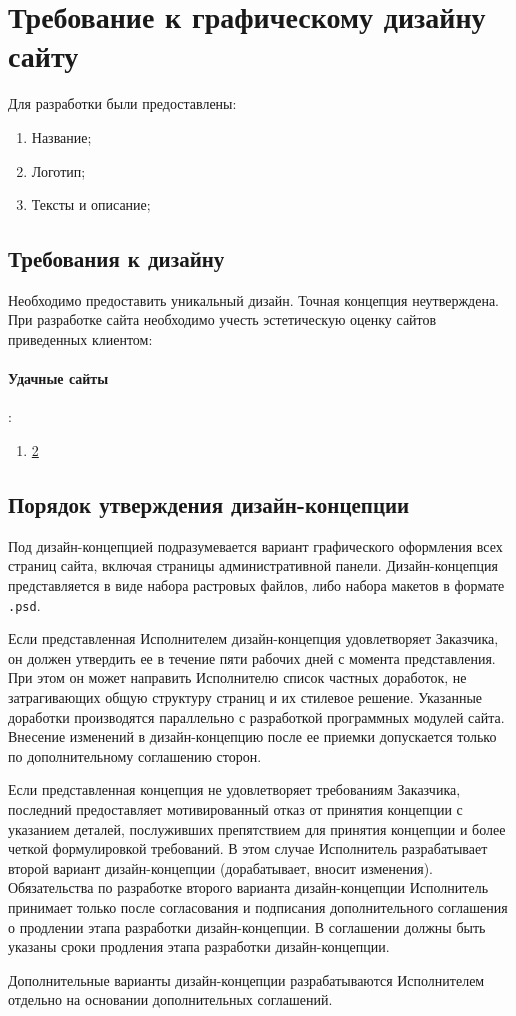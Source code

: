 \section{Требование к графическому дизайну сайту}
Для разработки были предоставлены:
\begin{enumerate}
  \item Название;
  \item Логотип;
  \item Тексты и описание;
\end{enumerate}
\subsection{Требования к дизайну}
Необходимо предоставить уникальный дизайн. Точная концепция неутверждена.
При разработке сайта необходимо учесть эстетическую оценку сайтов приведенных клиентом:
\paragraph{Удачные сайты}:
\begin{enumerate}
  \item \href{1}{2}
\end{enumerate}

\subsection{Порядок утверждения дизайн-концепции}
Под дизайн-концепцией подразумевается вариант графического оформления всех страниц сайта, включая страницы административной панели. Дизайн-концепция представляется в виде набора растровых файлов, либо набора макетов в формате \texttt{.psd}.

Если представленная Исполнителем дизайн-концепция удовлетворяет Заказчика, он должен утвердить ее в течение пяти рабочих дней с момента представления. При этом он может направить Исполнителю список частных доработок, не затрагивающих общую структуру страниц и их стилевое решение. Указанные доработки производятся параллельно с разработкой программных модулей сайта. Внесение изменений в дизайн-концепцию после ее приемки допускается только по дополнительному соглашению сторон.

Если представленная концепция не удовлетворяет требованиям Заказчика, последний предоставляет мотивированный отказ от принятия концепции с указанием деталей, послуживших препятствием для принятия концепции и более четкой формулировкой требований. В этом случае Исполнитель разрабатывает второй вариант дизайн-концепции (дорабатывает, вносит изменения). Обязательства по разработке второго варианта дизайн-концепции Исполнитель принимает только после согласования и подписания дополнительного соглашения о продлении этапа разработки дизайн-концепции. В соглашении должны быть указаны сроки продления этапа разработки дизайн-концепции.

Дополнительные варианты дизайн-концепции разрабатываются Исполнителем отдельно на основании дополнительных соглашений.
